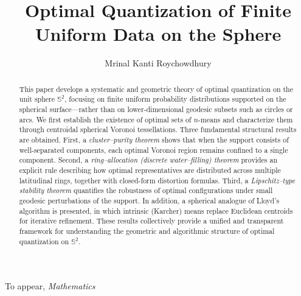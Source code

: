 \documentclass[12pt, reqno]{amsart}
\theoremstyle{plain}
\theoremstyle{definition}
\newcommand{\tit}{\textit}%
\newcommand{\nd}{\noindent}
\begin{document}
  \nd To appear,\tit{ Mathematics} 
\title{Optimal Quantization of Finite Uniform Data on the Sphere}
	

	\author{Mrinal Kanti Roychowdhury} 

\address{School of Mathematical and Statistical Sciences\\
		University of Texas Rio Grande Valley\\
		1201 West University Drive\\
		Edinburg, TX 78539-2999, USA.}
	
	
	
	
		
	
	\date{}
	\maketitle
	
	\pagestyle{myheadings}


 
\begin{abstract}
This paper develops a systematic and geometric theory of optimal quantization on the unit sphere $\mathbb S^2$, focusing on finite uniform probability distributions supported on the spherical surface---rather than on lower-dimensional geodesic subsets such as circles or arcs. We first establish the existence of optimal sets of $n$-means and characterize them through centroidal spherical Voronoi tessellations. Three fundamental structural results are obtained. 
First, a \emph{cluster--purity theorem} shows that when the support consists of well-separated components, each optimal Voronoi region remains confined to a single component. Second, a \emph{ring--allocation (discrete water--filling) theorem} provides an explicit rule describing how optimal representatives are distributed across multiple latitudinal rings, together with closed-form distortion formulas. Third, a \emph{Lipschitz--type stability theorem} quantifies the robustness of optimal configurations under small geodesic perturbations of the support. 
In addition, a spherical analogue of Lloyd’s algorithm is presented, in which intrinsic (Karcher) means replace Euclidean centroids for iterative refinement. These results collectively provide a unified and transparent framework for understanding the geometric and algorithmic structure of optimal quantization on $\mathbb S^2$.
\end{abstract}
\end{document}
